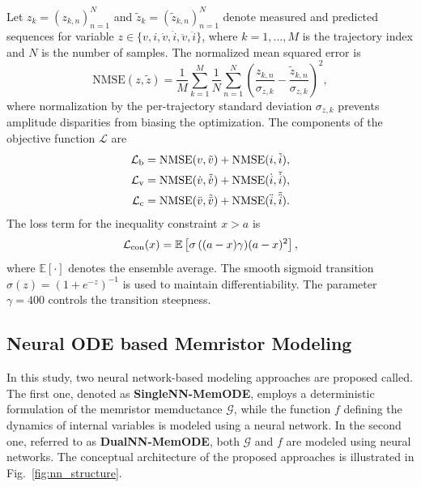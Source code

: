 \documentclass[a4,journal]{IEEEtran}
\newcommand{\G}{\mathcal{G}} %
\newcommand{\snum}{N} %
\newcommand{\sind}{n} %
\newcommand{\Loss}{\mathcal{L}}
\newcommand{\LossBase}{\Loss_{\rm b}}
\newcommand{\LossVel}{\Loss_{\rm v}}
\newcommand{\LossCur}{\Loss_{\rm c}}
\newcommand{\MemODEOne}{SingleNN-MemODE}
\newcommand{\MemODETwo}{DualNN-MemODE}
\newcommand{\NMSE}{\mathrm{NMSE}}
\newcommand{\NTraj}{M}
\begin{document}
Let \(z_k=(z_{k,\sind})_{\sind=1}^{\snum}\) and \(\tilde{z}_k=(\tilde{z}_{k,\sind})_{\sind=1}^{\snum}\) denote measured and predicted sequences for variable \(z \in \{v,i,\dot{v},\dot{i},\ddot{v},\ddot{i}\}\), where \(k = 1,\ldots, \NTraj\) is the trajectory index and \(\snum\) is the number of samples.
The normalized mean squared error is
\begin{equation}
  \NMSE(z,\tilde{z})=\frac{1}{\NTraj}\sum_{k=1}^{\NTraj}\frac{1}{\snum}\sum_{\sind=1}^{\snum}\left(\frac{{z}_{k,\sind}}{\sigma_{z,k}} -\frac{\tilde{z}_{k,\sind}}{\sigma_{z,k}}\right)^2,
\end{equation}
where normalization by the per-trajectory standard deviation \(\sigma_{z,k}\) prevents amplitude disparities from biasing the optimization.
The components of the objective function \(\Loss\) are
\begin{subequations}
\begin{align}
  \LossBase = \NMSE(v,\tilde{v})+\NMSE(i,\tilde{i}), \label{eq:base_loss}\\
  \LossVel = \NMSE(\dot{v},\tilde{\dot{v}})+\NMSE(\dot{i},\tilde{\dot{i}}), \label{eq:loss_v}\\
  \LossCur = \NMSE(\ddot{v},\tilde{\ddot{v}})+\NMSE(\ddot{i},\tilde{\ddot{i}}). \label{eq:loss_c}
\end{align}
\end{subequations}
The loss term for the inequality constraint \(x>a\) is
\begin{equation}
  \Loss_{\rm con}(x) = \mathbb{E}\left[ {\sigma\left((a-x)\gamma\right)}(a-x)^{2}\right],
  \label{eq:loss_con}
\end{equation}
where \(\mathbb{E}[\cdot]\) denotes the ensemble average. The smooth sigmoid transition \(\sigma(z) = (1+e^{-z})^{-1}\) is used to maintain differentiability. The parameter \(\gamma=400\) controls the transition steepness.


\subsection{Neural ODE based Memristor Modeling}

\noindent In this study, two neural network-based modeling approaches are proposed called. The first one, denoted as \textbf{\MemODEOne}, employs a deterministic formulation of the memristor memductance \(\G\), while the function \(f\) defining the dynamics of internal variables is modeled using a neural network. In the second one, referred to as \textbf{\MemODETwo}, both \(\G\) and \(f\) are modeled using neural networks. The conceptual architecture of the proposed approaches is illustrated in Fig.~\ref{fig:nn_structure}.
\end{document}
